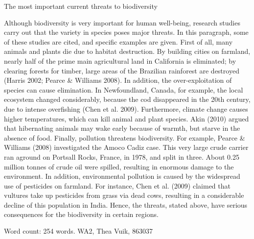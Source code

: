 \documentclass[a4paper,11pt]{article}
\begin{document}
\begin{center}
The most important current threats to biodiversity
\end{center}

{\color{blue}Although} biodiversity is {\color{red}very important for human well-being, research studies carry out} that the {\color{red}variety in} species {\color{red}poses major threats}. %
In this paragraph, some of these studies are cited, and {\color{red}specific examples} are given. %
First of all, many animals and plants die due to {\color{red}habitat destruction}. %
By building cities on farmland, nearly {\color{red}half of} the prime main {\color{red}agricultural land} in California is eliminated; by {\color{red}clearing forests} for timber, {\color{red}large areas} of the {\color{red}Brazilian rainforest} are destroyed (Harris 2002; Pearce \& Williams 2008). %
{\color{blue}In addition}, the over-exploitation of species can cause elimination. %
In Newfoundland, Canada, {\color{red}for example}, the {\color{red}local ecosystem changed considerably}, because the cod disappeared in the 20th century, due to {\color{red}intense overfishing} (Chen et al. 2009).  %
{\color{blue}Furthermore}, {\color{red}climate change} causes {\color{red}higher temperatures}, which can kill {\color{red}animal} and {\color{red}plant species}. %
Akin (2010) {\color{green}argued that} {\color{red}hibernating animals} may {\color{red}wake early} because of warmth, but starve {\color{red}in the absence of} food. %
{\color{blue}Finally}, pollution threatens biodiversity. %
{\color{red}For example}, Pearce \& Williams (2008) {\color{green}investigated} the Amoco Cadiz case. %
This {\color{red}very large crude carrier ran aground on} Portsall Rocks, France, in 1978, and {\color{red}split in three}. %
About 0.25 million tonnes of {\color{red}crude oil} were spilled, resulting in {\color{red}enormous damage to the environment}. %
{\color{blue}In addition}, {\color{red}environmental pollution} is caused by the {\color{red}widespread use} of pesticides on farmland. %
For instance, Chen et al. (2009) claimed that vultures {\color{red}take up pesticides} from grass via {\color{red}dead cows}, {\color{red}resulting in} a {\color{red}considerable decline of} this population in India. %
{\color{blue}Hence}, the threats, {\color{red}stated above}, have {\color{red}serious consequences} for the biodiversity in certain regions. %

Word count: 254 words. WA2, Thea Vuik, 863037
\end{document}
